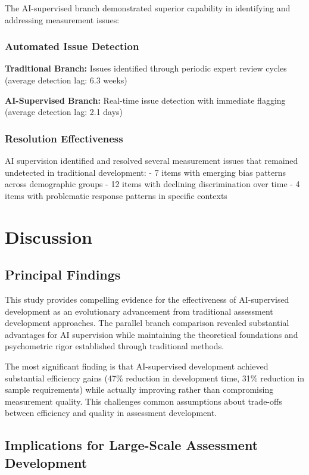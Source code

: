 \documentclass[12pt,a4paper]{article}
\begin{document}
The AI-supervised branch demonstrated superior capability in identifying and addressing measurement issues:

\subsubsection{Automated Issue Detection}

\textbf{Traditional Branch:} Issues identified through periodic expert review cycles (average detection lag: 6.3 weeks)

\textbf{AI-Supervised Branch:} Real-time issue detection with immediate flagging (average detection lag: 2.1 days)

\subsubsection{Resolution Effectiveness}

AI supervision identified and resolved several measurement issues that remained undetected in traditional development:
- 7 items with emerging bias patterns across demographic groups
- 12 items with declining discrimination over time
- 4 items with problematic response patterns in specific contexts

\section{Discussion}

\subsection{Principal Findings}

This study provides compelling evidence for the effectiveness of AI-supervised development as an evolutionary advancement from traditional assessment development approaches. The parallel branch comparison revealed substantial advantages for AI supervision while maintaining the theoretical foundations and psychometric rigor established through traditional methods.

The most significant finding is that AI-supervised development achieved substantial efficiency gains (47\% reduction in development time, 31\% reduction in sample requirements) while actually improving rather than compromising measurement quality. This challenges common assumptions about trade-offs between efficiency and quality in assessment development.

\subsection{Implications for Large-Scale Assessment Development}
\end{document}
